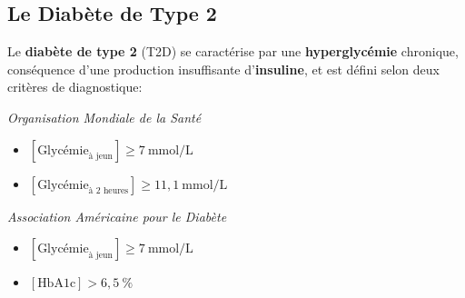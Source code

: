 \documentclass[10pt,  xcolors={RGB}, hyperref={%
    pdfpagelabels=false,
    colorlinks=true,
    pdftex=true,
    bookmarks=true,
    bookmarksopen=true,
    hyperfootnotes=true}]{beamer}
\newcommand\green[1]{{\color{springgreen3}\textbf{#1}}}
\begin{document}
\subsection{Le Diabète de Type 2}
\begin{frame}{\subsecname}
    \par{Le \green{diabète de type 2} (T2D) se caractérise par une \green{hyperglycémie} chronique, conséquence d'une production insuffisante d'\green{insuline}, et est défini selon deux critères de diagnostique:}

    \vspace{-1em}
    \begin{minipage}[t]{0.475\columnwidth}
        \vspace{1em}
        {\small
        \begin{description}\setlength{\itemsep}{1.5em}
            \item[OMS] \textit{Organisation Mondiale de la Santé}\\
                \begin{itemize}\setlength{\itemindent}{-0.25in}\vspace{-1.5em}
                    \item $[\textrm{Glycémie}_{\textrm{à jeun}}] \geq 7\ {\textrm{mmol/L}}$
                    \item $[\textrm{Glycémie}_{\textrm{à 2 heures}}] \geq 11,1\ {\textrm{mmol/L}}$
                \end{itemize}
            \item[ADA] \textit{Association Américaine pour le Diabète}\\
                \begin{itemize}\setlength{\itemindent}{-0.25in}\vspace{-1.5em}
                    \item $[\textrm{Glycémie}_{\textrm{à jeun}}] \geq 7\ {\textrm{mmol/L}}$
                    \item $[\textrm{HbA1c}] > 6,5\ \%$
                \end{itemize}
        \end{description}
        }
        \vspace{1em}
    \end{minipage}%
    \hfill\vline\hfill
    \begin{minipage}[t]{0.475\columnwidth}%
    \vspace{2em}
        \begin{center}

\end{center}
\end{minipage}
\end{frame}
\end{document}
